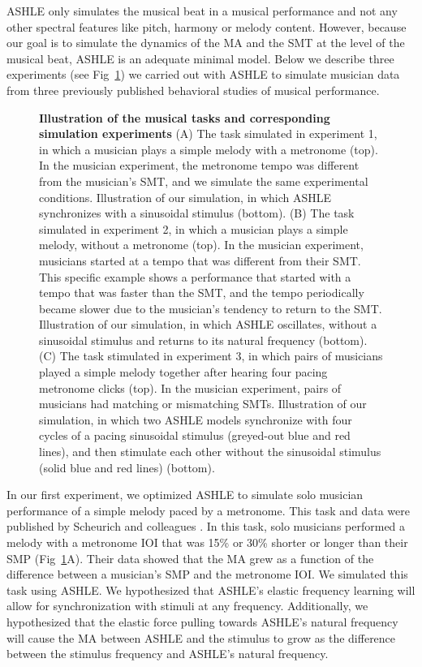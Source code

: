 \documentclass[10pt,letterpaper]{article}
\begin{document}
ASHLE only simulates the musical beat in a musical performance and not any other spectral features like pitch, harmony or melody content. However, because our goal is to simulate the dynamics of the MA and the SMT at the level of the musical beat, ASHLE is an adequate minimal model. Below we describe three experiments (see Fig~\ref{fig1}) we carried out with ASHLE to simulate musician data from three previously published behavioral studies of musical performance.

\begin{figure}[!h]
\caption{{\bf Illustration of the musical tasks and corresponding simulation experiments}
(A) The task simulated in experiment 1, in which a musician plays a simple melody with a metronome (top). In the musician experiment, the metronome tempo was different from the musician's SMT, and we simulate the same experimental conditions. Illustration of our simulation, in which ASHLE synchronizes with a sinusoidal stimulus (bottom). (B) The task simulated in experiment 2, in which a musician plays a simple melody, without a metronome (top). In the musician experiment, musicians started at a tempo that was different from their SMT. This specific example shows a performance that started with a tempo that was faster than the SMT, and the tempo periodically became slower due to the musician's tendency to return to the SMT. Illustration of our simulation, in which ASHLE oscillates, without a sinusoidal stimulus and returns to its natural frequency (bottom). (C) The task stimulated in experiment 3, in which pairs of musicians played a simple melody together after hearing four pacing metronome clicks (top). In the musician experiment, pairs of musicians had matching or mismatching SMTs. Illustration of our simulation, in which two ASHLE models synchronize with four cycles of a pacing sinusoidal stimulus (greyed-out blue and red lines), and then stimulate each other without the sinusoidal stimulus (solid blue and red lines) (bottom).}
\label{fig1}
\end{figure}

In our first experiment, we optimized ASHLE to simulate solo musician performance of a simple melody paced by a metronome. This task and data were published by Scheurich and colleagues \cite{scheurich2018tapping}. In this task, solo musicians performed a melody with a metronome IOI that was 15\% or 30\% shorter or longer than their SMP (Fig~\ref{fig1}A). Their data showed that the MA grew as a function of the difference between a musician's SMP and the metronome IOI. We simulated this task using ASHLE. We hypothesized that ASHLE's elastic frequency learning will allow for synchronization with stimuli at any frequency. Additionally, we hypothesized that the elastic force pulling towards ASHLE's natural frequency will cause the MA between ASHLE and the stimulus to grow as the difference between the stimulus frequency and ASHLE's natural frequency.
\end{document}
